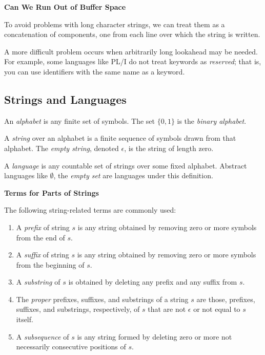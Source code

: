 \documentclass[12pt,a4paper,twoside,openany]{book}
\begin{document}
\begin{framed}
    \begin{center}
        \textbf{{\large Can We Run Out of Buffer Space}}
    \end{center}

    To avoid problems with long character strings, we can treat them as a concatenation of components, one from each line over which the string is written.

    A more difficult problem occurs when arbitrarily long lookahead may be needed. For example, some languages like PL/I do not treat keywords as \textit{reserved}; that is, you can use identifiers with the same name as a keyword.
\end{framed}

\subsection{Strings and Languages}

An \textit{alphabet} is any finite set of symbols. The set $\{0,1\}$ is the \textit{binary alphabet}.

A \textit{string} over an alphabet is a finite sequence of symbols drawn from that alphabet. The \textit{empty string}, denoted $\epsilon$, is the string of length zero.

A \textit{language} is any countable set of strings over some fixed alphabet. Abstract languages like $\emptyset$, the \textit{empty set} are languages under this definition.

\begin{framed}
    \begin{center}
        \textbf{{\large Terms for Parts of Strings}}
    \end{center}

    The following string-related terms are commonly used:
    \begin{enumerate}
        \item A \textit{prefix} of string $s$ is any string obtained by removing zero or more symbols from the end of $s$.
        \item A \textit{suffix} of string $s$ is any string obtained by removing zero or more symbols from the beginning of $s$.
        \item A \textit{substring} of $s$ is obtained by deleting any prefix and any suffix from $s$.
        \item The \textit{proper} prefixes, suffixes, and substrings of a string $s$ are those, prefixes, suffixes, and substrings, respectively, of $s$ that are not $\epsilon$ or not equal to $s$ itself.
        \item A \textit{subsequence} of $s$ is any string formed by deleting zero or more not necessarily consecutive positions of $s$.
    \end{enumerate}
\end{framed}
\end{document}
